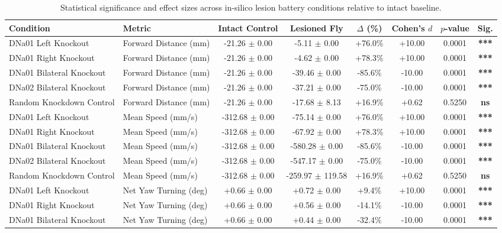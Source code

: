 \begin{table}[htbp]
\centering
\caption{Statistical significance and effect sizes across in-silico lesion battery conditions relative to intact baseline.}
\label{tab:lesion_significance}
\begin{tabular}{llcccccc}
\toprule
\textbf{Condition} & \textbf{Metric} & \textbf{Intact Control} & \textbf{Lesioned Fly} & \textbf{$\Delta$ (\%)} & \textbf{Cohen's $d$} & \textbf{$p$-value} & \textbf{Sig.} \\
\midrule
DNa01 Left Knockout & Forward Distance (mm) & -21.26 $\pm$ 0.00 & -5.11 $\pm$ 0.00 & +76.0\% & +10.00 & 0.0001 & \textbf{***} \\
DNa01 Right Knockout & Forward Distance (mm) & -21.26 $\pm$ 0.00 & -4.62 $\pm$ 0.00 & +78.3\% & +10.00 & 0.0001 & \textbf{***} \\
DNa01 Bilateral Knockout & Forward Distance (mm) & -21.26 $\pm$ 0.00 & -39.46 $\pm$ 0.00 & -85.6\% & -10.00 & 0.0001 & \textbf{***} \\
DNa02 Bilateral Knockout & Forward Distance (mm) & -21.26 $\pm$ 0.00 & -37.21 $\pm$ 0.00 & -75.0\% & -10.00 & 0.0001 & \textbf{***} \\
Random Knockdown Control & Forward Distance (mm) & -21.26 $\pm$ 0.00 & -17.68 $\pm$ 8.13 & +16.9\% & +0.62 & 0.5250 & \textbf{ns} \\
DNa01 Left Knockout & Mean Speed (mm/s) & -312.68 $\pm$ 0.00 & -75.14 $\pm$ 0.00 & +76.0\% & +10.00 & 0.0001 & \textbf{***} \\
DNa01 Right Knockout & Mean Speed (mm/s) & -312.68 $\pm$ 0.00 & -67.92 $\pm$ 0.00 & +78.3\% & +10.00 & 0.0001 & \textbf{***} \\
DNa01 Bilateral Knockout & Mean Speed (mm/s) & -312.68 $\pm$ 0.00 & -580.28 $\pm$ 0.00 & -85.6\% & -10.00 & 0.0001 & \textbf{***} \\
DNa02 Bilateral Knockout & Mean Speed (mm/s) & -312.68 $\pm$ 0.00 & -547.17 $\pm$ 0.00 & -75.0\% & -10.00 & 0.0001 & \textbf{***} \\
Random Knockdown Control & Mean Speed (mm/s) & -312.68 $\pm$ 0.00 & -259.97 $\pm$ 119.58 & +16.9\% & +0.62 & 0.5250 & \textbf{ns} \\
DNa01 Left Knockout & Net Yaw Turning (deg) & +0.66 $\pm$ 0.00 & +0.72 $\pm$ 0.00 & +9.4\% & +10.00 & 0.0001 & \textbf{***} \\
DNa01 Right Knockout & Net Yaw Turning (deg) & +0.66 $\pm$ 0.00 & +0.56 $\pm$ 0.00 & -14.1\% & -10.00 & 0.0001 & \textbf{***} \\
DNa01 Bilateral Knockout & Net Yaw Turning (deg) & +0.66 $\pm$ 0.00 & +0.44 $\pm$ 0.00 & -32.4\% & -10.00 & 0.0001 & \textbf{***} \\

\end{tabular}
\end{table}
